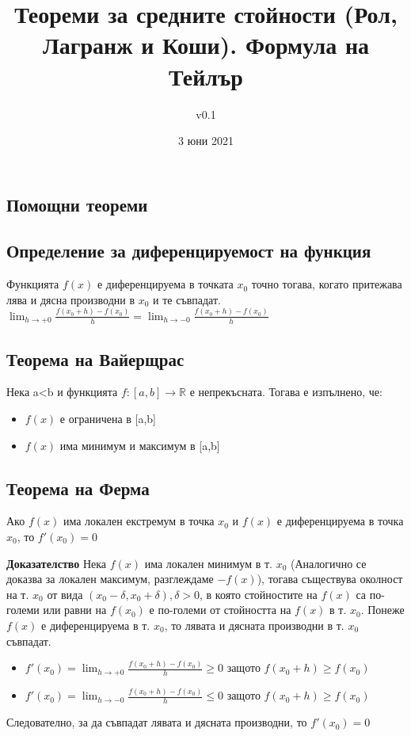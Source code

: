 \documentclass[fleqn,12pt]{article}
\title{Теореми  за  средните  стойности  (Рол,  Лагранж  и  Коши).  Формула  на Тейлър}
\author{v0.1}
\date{3 юни 2021}
\begin{document}
    
\maketitle

\tableofcontents

\begin{flushleft}
    
\section{Помощни теореми}

\subsection{Определение за диференцируемост на функция}
Функцията $f(x)$ е диференцируема в точката $x_0$ точно тогава, когато притежава лява и дясна производни в $x_0$ и те съвпадат.
\\$\lim_{h \to +0} \frac{f(x_0 + h)-f(x_0)}{h} = \lim_{h \to -0} \frac{ f(x_0 + h)-f(x_0)}{h}$

\subsection{Теорема на Вайерщрас}
Нека a<b и функцията $f:[a,b]\rightarrow\mathbb{R}$ е непрекъсната. Тогава е изпълнено, че:
\begin{itemize}
    \item $f(x)$ е ограничена в [a,b]
    \item $f(x)$ има минимум и максимум в [a,b] 
\end{itemize}

\subsection{Теорема на Ферма}
Ако $f(x)$ има локален екстремум в точка $x_0$ и $f(x)$ е диференцируема в точка $x_0$, то $f'(x_0)=0$

\textbf{Доказателство}
Нека $f(x)$ има локален минимум в т. $x_0$ (Аналогично се доказва за локален максимум, разглеждаме $-f(x)$),
тогава съществува околност на т. $x_0$ от вида $(x_0 - \delta,x_0 + \delta), \delta > 0$, в която стойностите на $f(x)$ са по-големи или равни на $f(x_0)$
е по-големи от стойността на $f(x)$ в т. $x_0$. Понеже $f(x)$ е диференцируема в т. $x_0$, то лявата и дясната производни в т. $x_0$ съвпадат.
\begin{itemize}
    \item $f'(x_0) = \lim_{h \to +0} \frac{ f(x_0 + h)-f(x_0)}{h} \geq 0$ защото $f(x_0 + h) \geq f(x_0)$
    \item $f'(x_0) = \lim_{h \to -0} \frac{ f(x_0 + h)-f(x_0)}{h} \leq 0$ защото $f(x_0 + h) \geq f(x_0)$
\end{itemize}
Следователно, за да съвпадат лявата и дясната производни, то $f'(x_0) = 0$


\end{flushleft}
\end{document}
